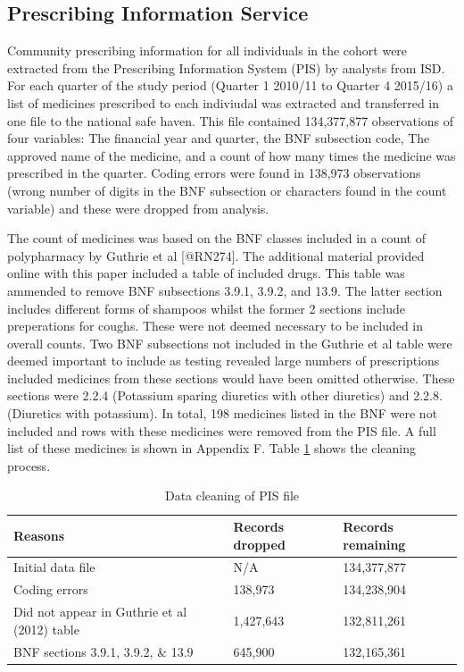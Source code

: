 \documentclass[]{article}
\begin{document}
\FloatBarrier

\subsection{Prescribing Information Service}\label{subsec:pis-summs}

Community prescribing information for all individuals in the cohort were
extracted from the Prescribing Information System (PIS) by analysts from
ISD. For each quarter of the study period (Quarter 1 2010/11 to Quarter
4 2015/16) a list of medicines prescribed to each indiviudal was
extracted and transferred in one file to the national safe haven. This
file contained 134,377,877 observations of four variables: The financial
year and quarter, the BNF subsection code, The approved name of the
medicine, and a count of how many times the medicine was prescribed in
the quarter. Coding errors were found in 138,973 observations (wrong
number of digits in the BNF subsection or characters found in the count
variable) and these were dropped from analysis.

The count of medicines was based on the BNF classes included in a count
of polypharmacy by Guthrie et al {[}@RN274{]}. The additional material
provided online with this paper included a table of included drugs. This
table was ammended to remove BNF subsections 3.9.1, 3.9.2, and 13.9. The
latter section includes different forms of shampoos whilst the former 2
sections include preperations for coughs. These were not deemed
necessary to be included in overall counts. Two BNF subsections not
included in the Guthrie et al table were deemed important to include as
testing revealed large numbers of prescriptions included medicines from
these sections would have been omitted otherwise. These sections were
2.2.4 (Potassium sparing diuretics with other diuretics) and 2.2.8.
(Diuretics with potassium). In total, 198 medicines listed in the BNF
were not included and rows with these medicines were removed from the
PIS file. A full list of these medicines is shown in Appendix F. Table
\ref{tab:dropped-meds} shows the cleaning process.

\begin{table}[h]
\centering
\caption{Data cleaning of PIS file}
\label{tab:dropped-meds}
\begin{tabular}{@{}lll@{}}
\toprule
Reasons & Records dropped & Records remaining \\ \midrule
Initial data file & N/A & 134,377,877 \\
Coding errors & 138,973 & 134,238,904 \\
Did not appear in Guthrie et al (2012) table & 1,427,643 & 132,811,261 \\
BNF sections 3.9.1, 3.9.2, \& 13.9 & 645,900 & 132,165,361 \\ \bottomrule
\end{tabular}
\end{table}
\end{document}
